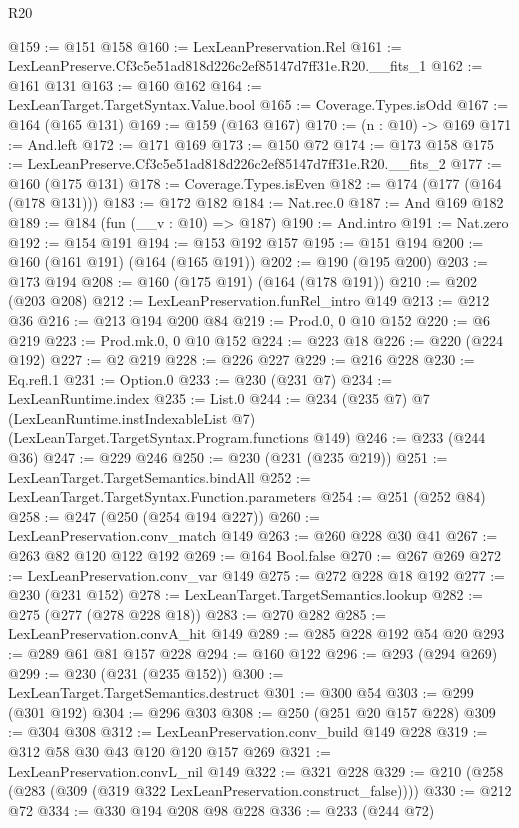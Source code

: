 \begin{lexlean}{R20}
\begin{coremodule}
@159 := @151 @158
@160 := LexLeanPreservation.Rel
@161 := LexLeanPreserve.Cf3c5e51ad818d226c2ef85147d7ff31e.R20.__fits_1
@162 := @161 @131
@163 := @160 @162
@164 := LexLeanTarget.TargetSyntax.Value.bool
@165 := Coverage.Types.isOdd
@167 := @164 (@165 @131)
@169 := @159 (@163 @167)
@170 := (n : @10) -> @169
@171 := And.left
@172 := @171 @169
@173 := @150 @72
@174 := @173 @158
@175 := LexLeanPreserve.Cf3c5e51ad818d226c2ef85147d7ff31e.R20.__fits_2
@177 := @160 (@175 @131)
@178 := Coverage.Types.isEven
@182 := @174 (@177 (@164 (@178 @131)))
@183 := @172 @182
@184 := Nat.rec.{0}
@187 := And @169 @182
@189 := @184 (fun (__v : @10) => @187)
@190 := And.intro
@191 := Nat.zero
@192 := @154 @191
@194 := @153 @192 @157
@195 := @151 @194
@200 := @160 (@161 @191) (@164 (@165 @191))
@202 := @190 (@195 @200)
@203 := @173 @194
@208 := @160 (@175 @191) (@164 (@178 @191))
@210 := @202 (@203 @208)
@212 := LexLeanPreservation.funRel_intro @149
@213 := @212 @36
@216 := @213 @194 @200 @84
@219 := Prod.{0, 0} @10 @152
@220 := @6 @219
@223 := Prod.mk.{0, 0} @10 @152
@224 := @223 @18
@226 := @220 (@224 @192)
@227 := @2 @219
@228 := @226 @227
@229 := @216 @228
@230 := Eq.refl.{1}
@231 := Option.{0}
@233 := @230 (@231 @7)
@234 := LexLeanRuntime.index
@235 := List.{0}
@244 := @234
    (@235 @7)
    @7
    (LexLeanRuntime.instIndexableList @7)
    (LexLeanTarget.TargetSyntax.Program.functions @149)
@246 := @233 (@244 @36)
@247 := @229 @246
@250 := @230 (@231 (@235 @219))
@251 := LexLeanTarget.TargetSemantics.bindAll
@252 := LexLeanTarget.TargetSyntax.Function.parameters
@254 := @251 (@252 @84)
@258 := @247 (@250 (@254 @194 @227))
@260 := LexLeanPreservation.conv_match @149
@263 := @260 @228 @30 @41
@267 := @263 @82 @120 @122 @192
@269 := @164 Bool.false
@270 := @267 @269
@272 := LexLeanPreservation.conv_var @149
@275 := @272 @228 @18 @192
@277 := @230 (@231 @152)
@278 := LexLeanTarget.TargetSemantics.lookup
@282 := @275 (@277 (@278 @228 @18))
@283 := @270 @282
@285 := LexLeanPreservation.convA_hit @149
@289 := @285 @228 @192 @54 @20
@293 := @289 @61 @81 @157 @228
@294 := @160 @122
@296 := @293 (@294 @269)
@299 := @230 (@231 (@235 @152))
@300 := LexLeanTarget.TargetSemantics.destruct
@301 := @300 @54
@303 := @299 (@301 @192)
@304 := @296 @303
@308 := @250 (@251 @20 @157 @228)
@309 := @304 @308
@312 := LexLeanPreservation.conv_build @149 @228
@319 := @312 @58 @30 @43 @120 @120 @157 @269
@321 := LexLeanPreservation.convL_nil @149
@322 := @321 @228
@329 := @210 (@258 (@283 (@309 (@319 @322 LexLeanPreservation.construct_false))))
@330 := @212 @72
@334 := @330 @194 @208 @98 @228
@336 := @233 (@244 @72)

\end{coremodule}
\end{lexlean}
